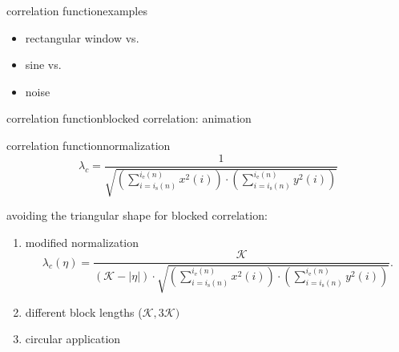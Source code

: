         \begin{frame}{correlation function}{examples}
            
            {
			\begin{itemize}
				\item	rectangular window vs.
				\item	sine vs.
				\item	noise
			\end{itemize}
            }
            \pause
            \vspace{-7mm}
        \end{frame}	

        \begin{frame}{correlation function}{blocked correlation: animation}
        \end{frame}	 

        \begin{frame}{correlation function}{normalization}
            \begin{equation*}\label{eq:corrnorm}
                \lambda_c = \frac{1}{\sqrt{\left(\sum\limits_{i=i_{\mathrm{s}}(n)}^{i_{\mathrm{e}}(n)}{x^2(i)}\right)\cdot \left(\sum\limits_{i=i_{\mathrm{s}}(n)}^{i_{\mathrm{e}}(n)}{y^2(i)}\right)}} 
            \end{equation*}
            
            \pause
            avoiding the triangular shape for blocked correlation:
            \pause
            \begin{enumerate}
                \item	modified normalization
                    \begin{equation*}
                        \lambda_c(\eta) = \frac{\mathcal{K}}{(\mathcal{K}-|\eta|)\cdot\sqrt{\left(\sum\limits_{i=i_{\mathrm{s}}(n)}^{i_{\mathrm{e}}(n)}{x^2(i)}\right)\cdot \left(\sum\limits_{i=i_{\mathrm{s}}(n)}^{i_{\mathrm{e}}(n)}{y^2(i)}\right)}} .
                    \end{equation*}
                \pause
                \item	different block lengths ($\mathcal{K},3\mathcal{K})$
                \pause
                \item	circular application
            \end{enumerate}
        \end{frame}	

